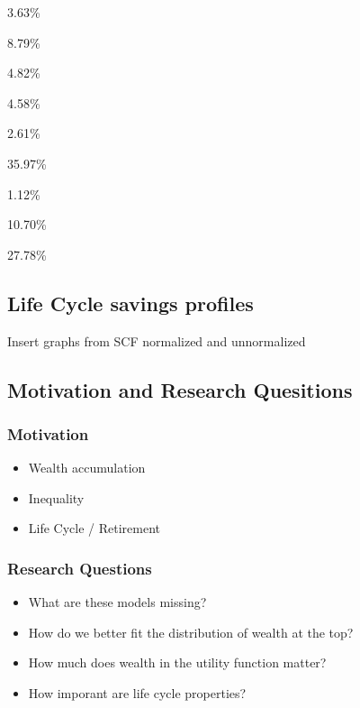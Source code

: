 \documentclass[
  letterpaper,
  DIV=11,
  numbers=noendperiod]{scrartcl}
\providecommand{\tightlist}{%
  \setlength{\itemsep}{0pt}\setlength{\parskip}{0pt}}\usepackage{longtable,booktabs,array}
\begin{document}
3.63\%

8.79\%

4.82\%

4.58\%

2.61\%

35.97\%

1.12\%

10.70\%

27.78\%

\subsection{Life Cycle savings
profiles}\label{life-cycle-savings-profiles}

Insert graphs from SCF normalized and unnormalized

\subsection{Motivation and Research
Quesitions}\label{motivation-and-research-quesitions}

\subsubsection{Motivation}\label{motivation}

\begin{itemize}
\tightlist
\item
  Wealth accumulation
\item
  Inequality
\item
  Life Cycle / Retirement
\end{itemize}

\subsubsection{Research Questions}\label{research-questions}

\begin{itemize}
\tightlist
\item
  What are these models missing?
\item
  How do we better fit the distribution of wealth at the top?
\item
  How much does wealth in the utility function matter?
\item
  How imporant are life cycle properties?
\end{itemize}
\end{document}
